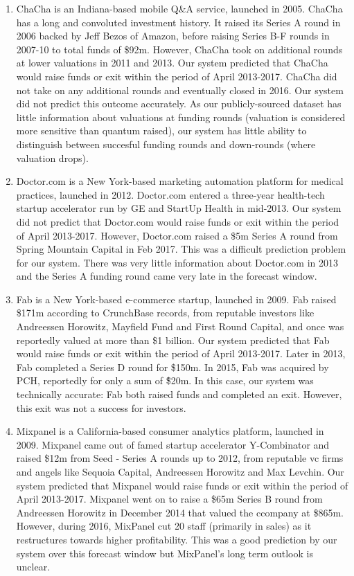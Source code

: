 \begin{enumerate}

\item ChaCha is an Indiana-based mobile Q\&A service, launched in 2005. ChaCha has a long and convoluted investment history. It raised its Series A round in 2006 backed by Jeff Bezos of Amazon, before raising Series B-F rounds in 2007-10 to total funds of \$92m. However, ChaCha took on additional rounds at lower valuations in 2011 and 2013. Our system predicted that ChaCha would raise funds or exit within the period of April 2013-2017. ChaCha did not take on any additional rounds and eventually closed in 2016. Our system did not predict this outcome accurately. As our publicly-sourced dataset has little information about valuations at funding rounds (valuation is considered more sensitive than quantum raised), our system has little ability to distinguish between succesful funding rounds and down-rounds (where valuation drops).

\item Doctor.com is a New York-based marketing automation platform for medical practices, launched in 2012. Doctor.com entered a three-year health-tech startup accelerator run by GE and StartUp Health in mid-2013. Our system did not predict that Doctor.com would raise funds or exit within the period of April 2013-2017. However, Doctor.com raised a \$5m Series A round from Spring Mountain Capital in Feb 2017. This was a difficult prediction problem for our system. There was very little information about Doctor.com in 2013 and the Series A funding round came very late in the forecast window.

\item Fab is a New York-based e-commerce startup, launched in 2009. Fab raised \$171m according to CrunchBase records, from reputable investors like Andreessen Horowitz, Mayfield Fund and First Round Capital, and once was reportedly valued at more than \$1 billion. Our system predicted that Fab would raise funds or exit within the period of April 2013-2017. Later in 2013, Fab completed a Series D round for \$150m. In 2015, Fab was acquired by PCH, reportedly for only a sum of \~\$20m. In this case, our system was technically accurate: Fab both raised funds and completed an exit. However, this exit was not a success for investors.

\item Mixpanel is a California-based consumer analytics platform, launched in 2009. Mixpanel came out of famed startup accelerator Y-Combinator and raised \$12m from Seed - Series A rounds up to 2012, from reputable \gls{vc} firms and angels like Sequoia Capital, Andreessen Horowitz and Max Levchin. Our system predicted that Mixpanel would raise funds or exit within the period of April 2013-2017.  Mixpanel went on to raise a \$65m Series B round from Andreessen Horowitz in December 2014 that valued the ccompany at \$865m. However, during 2016, MixPanel cut 20 staff (primarily in sales) as it restructures towards higher profitability. This was a good prediction by our system over this forecast window but MixPanel's long term outlook is unclear.

\end{enumerate}

